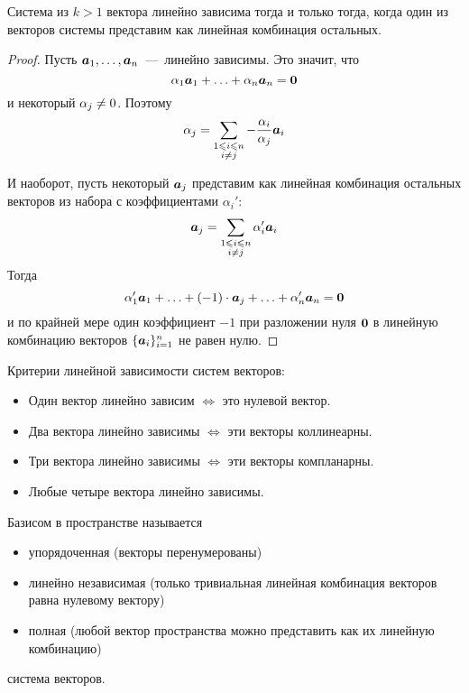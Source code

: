 \documentclass[a4paper,12pt]{article}
\begin{document}
  \begin{theorem}
    Система из $k > 1$ вектора линейно зависима тогда и только тогда, когда один из векторов системы представим как линейная комбинация остальных.
  \end{theorem}
  
  \begin{proof}
    Пусть $\boldsymbol a_1, \ldots, \boldsymbol a_n$~---~линейно зависимы.
    Это значит, что
    \[
      \alpha_1 \boldsymbol a_1 + \ldots + \alpha_n \boldsymbol a_n = \boldsymbol 0
    \]
    и некоторый $\alpha_j \hm{\not=} 0$.
    Поэтому
    \[
      \alpha_j = \sum\limits_{\substack{1 \leqslant i \leqslant n\\i \not= j}} -\frac{\alpha_i}{\alpha_j} \boldsymbol a_i
    \]
    
    И наоборот, пусть некоторый $\boldsymbol a_j$ представим как линейная комбинация остальных векторов из набора с коэффициентами $\alpha_i'$:
    \[
      \boldsymbol a_j = \sum\limits_{\substack{1 \leqslant i \leqslant n\\i \not= j}} \alpha_i' \boldsymbol a_i
    \]
    Тогда
    \[
      \alpha_1' \boldsymbol a_1 + \ldots + (-1) \cdot \boldsymbol a_j + \ldots + \alpha_n' \boldsymbol a_n = \boldsymbol 0
    \]
    и по крайней мере один коэффициент $-1$ при разложении нуля $\boldsymbol 0$ в линейную комбинацию векторов $\{\boldsymbol a_i\}_{i=1}^n$ не равен нулю.
  \end{proof}
  
  \begin{theorem}\label{theo:linear-dependence-criteria}
    Критерии линейной зависимости систем векторов:
    \begin{itemize}
      \item Один вектор линейно зависим $\Leftrightarrow$ это нулевой вектор.
      \item Два вектора линейно зависимы $\Leftrightarrow$ эти векторы коллинеарны.
      \item Три вектора линейно зависимы $\Leftrightarrow$ эти векторы компланарны.
      \item Любые четыре вектора линейно зависимы.
    \end{itemize}
  \end{theorem}
  
  \begin{definition}[Базис]
    Базисом в пространстве называется
    \begin{itemize}
      \item упорядоченная (векторы перенумерованы)
      \item линейно независимая (только тривиальная линейная комбинация векторов равна нулевому вектору)
      \item полная (любой вектор пространства можно представить как их линейную комбинацию)
    \end{itemize}
    система векторов.
  \end{definition}
  
\end{document}
